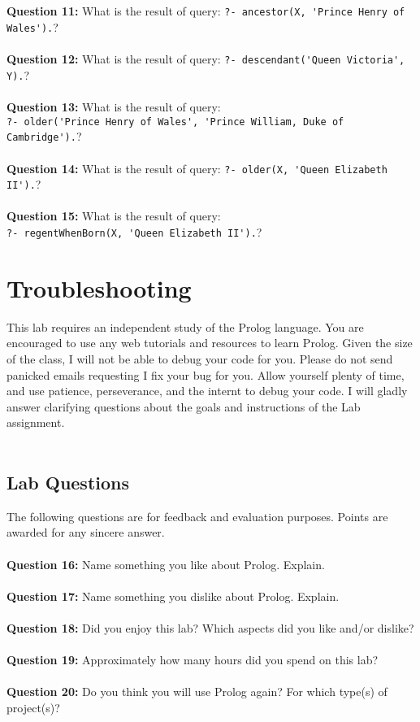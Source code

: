 \documentclass{article}
\begin{document}
\begin{tcolorbox}
 \\\\
 \noindent \textbf{Question 11:} What is the result of query: \verb|?- ancestor(X, 'Prince Henry of Wales').|?
 \\\\
 \noindent \textbf{Question 12:} What is the result of query: \verb|?- descendant('Queen Victoria', Y).|?
 \\\\
 \noindent \textbf{Question 13:} What is the result of query:\\\verb|?- older('Prince Henry of Wales', 'Prince William, Duke of Cambridge').|?
 \\\\
 \noindent \textbf{Question 14:} What is the result of query: \verb|?- older(X, 'Queen Elizabeth II').|?
 \\\\
 \noindent \textbf{Question 15:} What is the result of query:\\\verb|?- regentWhenBorn(X, 'Queen Elizabeth II').|?
\end{tcolorbox}

\section*{Troubleshooting}
This lab requires an independent study of the Prolog language. You are encouraged to use any web tutorials and resources to learn Prolog. Given the size of the class, I will not be able to debug your code for you. Please do not send panicked emails requesting I fix your bug for you. Allow yourself plenty of time, and use patience, perseverance, and the internt to debug your code. I will gladly answer clarifying questions about the goals and instructions of the Lab assignment.
\\\\
\begin{tcolorbox}
 \section*{Lab Questions}
 The following questions are for feedback and evaluation purposes. Points are awarded for any sincere answer.
 \\\\
 \noindent \textbf{Question 16:} Name something you like about Prolog. Explain.
 \\\\
 \noindent \textbf{Question 17:} Name something you dislike about Prolog. Explain.
 \\\\
 \noindent \textbf{Question 18:} Did you enjoy this lab? Which aspects did you like and/or dislike?
 \\\\
 \noindent \textbf{Question 19:} Approximately how many hours did you spend on this lab?
 \\\\
 \noindent \textbf{Question 20:} Do you think you will use Prolog again? For which type(s) of project(s)?
\end{tcolorbox}
\end{document}
